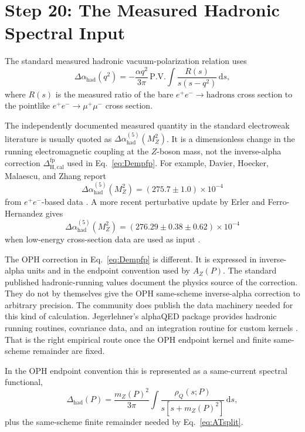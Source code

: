 \documentclass[11pt]{article}
\theoremstyle{remark}
\newcommand{\dd}{\,\mathrm d}
\newcommand{\AZ}{A_Z}
\newcommand{\Dcalib}{\Delta_{\mathrm{H,cal}}}
\newcommand{\Dhad}{\Delta_{\mathrm{had}}}
\begin{document}
\section{Step 20: The Measured Hadronic Spectral Input}

The standard measured hadronic vacuum-polarization relation uses
\begin{equation}
\Delta\alpha_{\mathrm{had}}(q^2)
=
-\frac{\alpha q^2}{3\pi}\,
\mathrm{P.V.}\!\int \frac{R(s)}{s(s-q^2)}\dd s,
\label{eq:dispersion}
\end{equation}
where \(R(s)\) is the measured ratio of the bare \(e^+e^-\to\mathrm{hadrons}\) cross section to the pointlike \(e^+e^-\to\mu^+\mu^-\) cross section.

The independently documented measured quantity in the standard electroweak literature is usually quoted as \(\Delta\alpha_{\mathrm{had}}^{(5)}(M_Z^2)\). It is a dimensionless change in the running electromagnetic coupling at the \(Z\)-boson mass, not the inverse-alpha correction \(\Dcalib^{\mathrm{fp}}\) used in Eq.~\eqref{eq:Dempfp}. For example, Davier, Hoecker, Malaescu, and Zhang report
\[
\Delta\alpha_{\mathrm{had}}^{(5)}(M_Z^2)=(275.7\pm1.0)\times10^{-4}
\]
from \(e^+e^-\)-based data \cite{dhmz}. A more recent perturbative update by Erler and Ferro-Hernandez gives
\[
\Delta\alpha_{\mathrm{had}}^{(5)}(M_Z^2)
=\left(276.29\pm0.38\pm0.62\right)\times10^{-4}
\]
when low-energy cross-section data are used as input \cite{erler-ferro}.

The OPH correction in Eq.~\eqref{eq:Dempfp} is different. It is expressed in inverse-alpha units and in the endpoint convention used by \(\AZ(P)\). The standard published hadronic-running values document the physics source of the correction. They do not by themselves give the OPH same-scheme inverse-alpha correction to arbitrary precision. The community does publish the data machinery needed for this kind of calculation. Jegerlehner's alphaQED package provides hadronic running routines, covariance data, and an integration routine for custom kernels \cite{alphaqed}. That is the right empirical route once the OPH endpoint kernel and finite same-scheme remainder are fixed.

In the OPH endpoint convention this is represented as a same-current spectral functional,
\begin{equation}
\Dhad(P)
=
\frac{m_Z(P)^2}{3\pi}
\int \frac{\rho_Q(s;P)}{s[s+m_Z(P)^2]}\dd s,
\label{eq:ophhadron}
\end{equation}
plus the same-scheme finite remainder needed by Eq.~\eqref{eq:ATsplit}.
\end{document}
